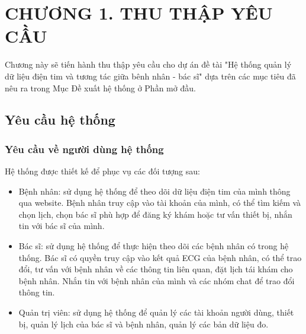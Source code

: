 
\section*{CHƯƠNG 1. THU THẬP YÊU CẦU}
\setcounter{section}{1}
\setcounter{subsection}{0} %
\setcounter{table}{0} %
\setcounter{figure}{0} %
Chương này sẽ tiến hành thu thập yêu cầu cho dự án đề tài "Hệ thống quản lý dữ liệu điện tim và tương tác giữa bênh nhân - bác sĩ"
dựa trên các mục tiêu đã nêu ra trong Mục Đề xuất hệ thống ở Phần mở đầu.

\subsection{Yêu cầu hệ thống}
\subsubsection{Yêu cầu về người dùng hệ thống}
Hệ thống được thiết kế để phục vụ các đối tượng sau:
\begin{adjustwidth}{1.5em}{}
\begin{itemize}
    \item Bệnh nhân: sử dụng hệ thống để theo dõi dữ liệu điện tim của mình thông qua website. 
    Bệnh nhân truy cập vào tài khoản của mình, có thể tìm kiếm và chọn lịch, 
    chọn bác sĩ phù hợp để đăng ký khám hoặc tư vấn thiết bị, nhắn tin với bác sĩ của mình.
    
    \item Bác sĩ: sử dụng hệ thống để thực hiện theo dõi các bệnh nhân có trong hệ thống. 
    Bác sĩ có quyền truy cập vào kết quả ECG của bệnh nhân, có thể trao đổi, 
    tư vấn với bệnh nhân về các thông tin liên quan, đặt lịch tái khám cho bệnh nhân. 
    Nhắn tin với bệnh nhân của mình và các nhóm chat để trao đổi thông tin.
    
    \item Quản trị viên: sử dụng hệ thống để quản lý các tài khoản người dùng, thiết bị, 
    quản lý lịch của bác sĩ và bệnh nhân, quản lý các bản dữ liệu đo.
    
\end{itemize}
\end{adjustwidth}


